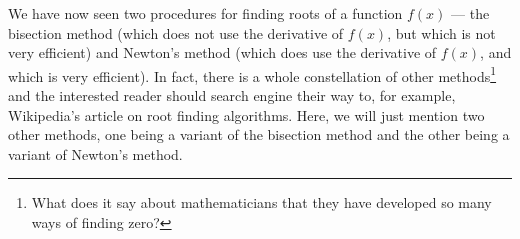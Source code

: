 We have now seen two procedures for finding roots of a function $f(x)$ --- 
   the bisection method (which does not use the derivative of $f(x)$, but which 
       is not very efficient) and
   Newton's method  (which does use the derivative of $f(x)$, and which 
       is very efficient). 
In fact, there is a whole constellation of other methods\footnote{What does it say about mathematicians that they have developed so many ways of finding zero?} 
and the interested reader should search engine their way to, for example, Wikipedia's article on root finding algorithms. Here, we will just mention two other methods, one being a variant of the bisection method and 
the other being a variant of Newton's method.

